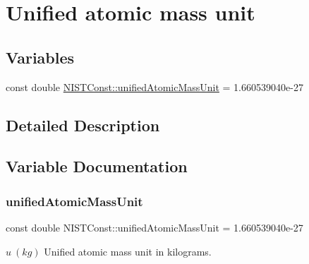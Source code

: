 \hypertarget{group___unified_atomic_mass_unit}{}\section{Unified atomic mass unit}
\label{group___unified_atomic_mass_unit}
\subsection*{Variables}
\begin{DoxyCompactItemize}
\item 
const double \hyperlink{group___unified_atomic_mass_unit_ga5dbf5ee7e0ef084434d647e917855f39}{N\+I\+S\+T\+Const\+::unified\+Atomic\+Mass\+Unit} = 1.\+660539040e-\/27
\end{DoxyCompactItemize}


\subsection{Detailed Description}


\subsection{Variable Documentation}
\mbox{\label{group___unified_atomic_mass_unit_ga5dbf5ee7e0ef084434d647e917855f39}} 
\subsubsection{\texorpdfstring{unified\+Atomic\+Mass\+Unit}{unifiedAtomicMassUnit}}
{\footnotesize\ttfamily const double N\+I\+S\+T\+Const\+::unified\+Atomic\+Mass\+Unit = 1.\+660539040e-\/27}

$u \ (kg)$ Unified atomic mass unit in kilograms. 